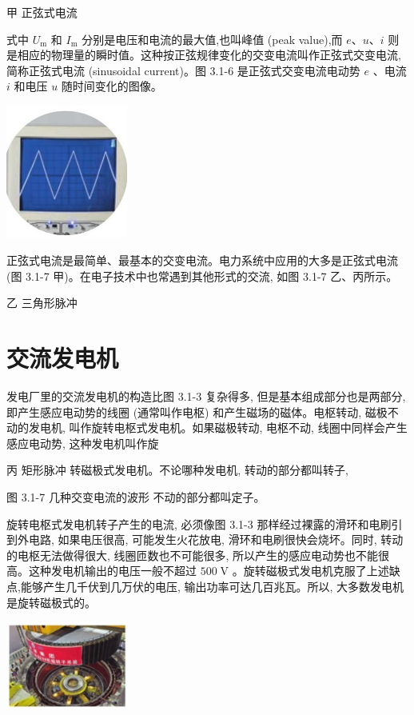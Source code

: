 \documentclass[10pt]{article}
\begin{document}
甲 正弦式电流

式中 \({U}_{\mathrm{m}}\) 和 \({I}_{\mathrm{m}}\) 分别是电压和电流的最大值,也叫峰值 (peak value),而 \(e\text{、}u\text{、}i\) 则是相应的物理量的瞬时值。这种按正弦规律变化的交变电流叫作正弦式交变电流, 简称正弦式电流 (sinusoidal current)。图 3.1-6 是正弦式交变电流电动势 \(e\) 、电流 \(i\) 和电压 \(u\) 随时间变化的图像。

\begin{center}
\includegraphics[max width=0.3\textwidth]{images/01910e72-c5b7-7ed5-a6d4-fb3a5faefc32_57_372940.jpg}
\end{center}

正弦式电流是最简单、最基本的交变电流。电力系统中应用的大多是正弦式电流 (图 3.1-7 甲)。在电子技术中也常遇到其他形式的交流, 如图 3.1-7 乙、丙所示。

乙 三角形脉冲

\section*{交流发电机}

发电厂里的交流发电机的构造比图 3.1-3 复杂得多, 但是基本组成部分也是两部分, 即产生感应电动势的线圈 (通常叫作电枢) 和产生磁场的磁体。电枢转动, 磁极不动的发电机, 叫作旋转电枢式发电机。如果磁极转动, 电枢不动, 线圈中同样会产生感应电动势, 这种发电机叫作旋

丙 矩形脉冲 转磁极式发电机。不论哪种发电机, 转动的部分都叫转子,

图 3.1-7 几种交变电流的波形 不动的部分都叫定子。

旋转电枢式发电机转子产生的电流, 必须像图 3.1-3 那样经过裸露的滑环和电刷引到外电路, 如果电压很高, 可能发生火花放电, 滑环和电刷很快会烧坏。同时, 转动的电枢无法做得很大, 线圈匝数也不可能很多, 所以产生的感应电动势也不能很高。这种发电机输出的电压一般不超过 \({500}\mathrm{\;V}\) 。旋转磁极式发电机克服了上述缺点,能够产生几千伏到几万伏的电压, 输出功率可达几百兆瓦。所以, 大多数发电机是旋转磁极式的。

\begin{center}
\includegraphics[max width=0.3\textwidth]{images/01910e72-c5b7-7ed5-a6d4-fb3a5faefc32_58_554978.jpg}
\end{center}
\end{document}
